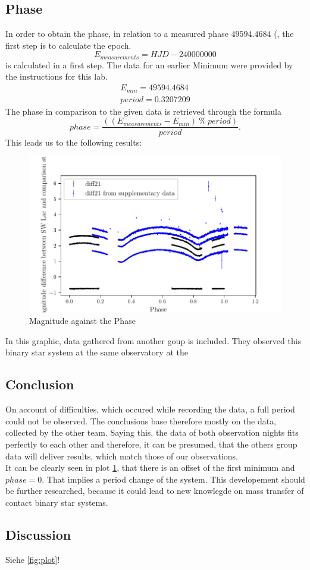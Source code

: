 \subsection{Phase}
  \label{sec:again}
  In order to obtain the phase, in relation to a measured phase $49594.4684$ (, the first step is to calculate the epoch.
  \begin{equation*}
    E_{measurements} = HJD - 240000000
  \end{equation*}
  is calculated in a first step. The data for an earlier Minimum were provided by the 
  instructions for this lab. 
  \begin{align*}
    E_{min} = 49594.4684\\
    period = 0.3207209
  \end{align*}
  The phase in comparison to the given data is retrieved through the formula
  \begin{equation}
    phase = \dfrac{((E_{measurements}-E_{min})\ \% \ period)}{period}.
  \end{equation}
  This leads us to the following results:
  \begin{figure}[H]
    \centering
    \includegraphics{gdPhase.pdf}
    \caption{Magnitude against the Phase}
    \label{fig:phase}
  \end{figure}
  In this graphic, data gathered from another goup is included. %
  They observed this binary star system at the same observatory at the %

\subsection{Conclusion}
  \label{sec:fuckoff}
  On account of difficulties, which occured while recording the data, a full period could not
  be observed. The conclusions base therefore mostly on the data, collected by the other team.
  Saying this, the data of both observation nights fits perfectly to each other and therefore, 
  it can be presumed, that the others group data will deliver results, which match those of our 
  observations.\\
  It can be clearly seen in plot \ref{fig:phase}, that there is an offset of the first minimum 
  and $phase = 0$. That implies a period change of the system. This developement should be 
  further researched, because it could lead to new knowlegde on mass transfer of contact binary
  star systems.

\subsection{Discussion}
  \label{sec:orange}




Siehe \autoref{fig:plot}!
